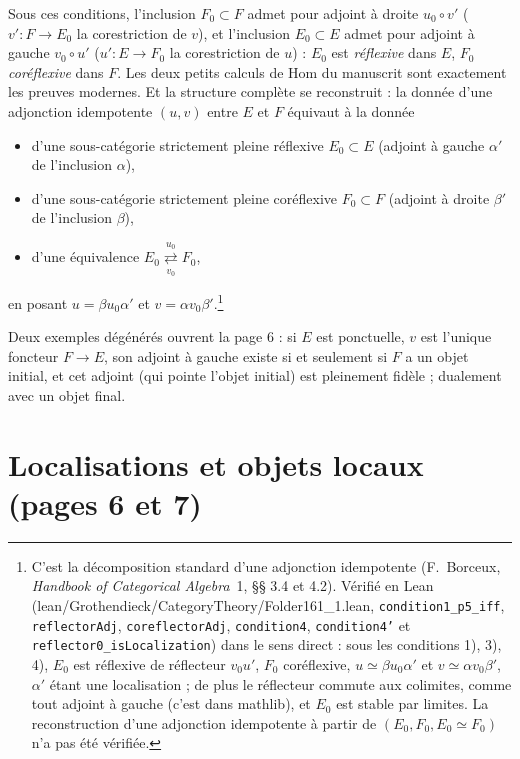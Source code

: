 \documentclass[11pt,a4paper]{article}
\begin{document}
Sous ces conditions, l'inclusion $F_0 \subset F$ admet pour adjoint à
droite $u_0 \circ v'$ ($v' : F \to E_0$ la corestriction de $v$), et
l'inclusion $E_0 \subset E$ admet pour adjoint à gauche $v_0 \circ u'$
($u' : E \to F_0$ la corestriction de $u$) : $E_0$ est
\emph{réflexive} dans $E$, $F_0$ \emph{coréflexive} dans $F$. Les deux
petits calculs de Hom du manuscrit sont exactement les preuves modernes.
Et la structure complète se reconstruit : la donnée d'une adjonction
idempotente $(u, v)$ entre $E$ et $F$ équivaut à la donnée
\begin{itemize}
\item d'une sous-catégorie strictement pleine réflexive $E_0 \subset E$
(adjoint à gauche $\alpha'$ de l'inclusion $\alpha$),
\item d'une sous-catégorie strictement pleine coréflexive $F_0 \subset F$
(adjoint à droite $\beta'$ de l'inclusion $\beta$),
\item d'une équivalence $E_0 \underset{v_0}{\overset{u_0}{\rightleftarrows}} F_0$,
\end{itemize}
en posant $u = \beta u_0 \alpha'$ et $v = \alpha v_0 \beta'$.\footnote{C'est
la décomposition standard d'une adjonction idempotente (F.~Borceux,
\emph{Handbook of Categorical Algebra}~1, §§ 3.4 et 4.2). Vérifié en Lean
(lean/Grothendieck/CategoryTheory/Folder161\_1.lean, \texttt{condition1\_p5\_iff},
\texttt{reflectorAdj}, \texttt{coreflectorAdj}, \texttt{condition4},
\texttt{condition4'} et \texttt{reflector0\_isLocalization}) dans le sens
direct : sous les conditions 1), 3), 4), $E_0$ est réflexive de réflecteur
$v_0 u'$, $F_0$ coréflexive, $u \simeq \beta u_0 \alpha'$ et
$v \simeq \alpha v_0 \beta'$, $\alpha'$ étant une localisation ; de plus le
réflecteur commute aux colimites, comme tout adjoint à gauche (c'est dans
mathlib), et $E_0$ est stable par limites. La reconstruction d'une adjonction
idempotente à partir de $(E_0, F_0, E_0 \simeq F_0)$ n'a pas été vérifiée.}

Deux exemples dégénérés ouvrent la page 6 : si $E$ est ponctuelle, $v$
est l'unique foncteur $F \to E$, son adjoint à gauche existe si et
seulement si $F$ a un objet initial, et cet adjoint (qui pointe l'objet
initial) est pleinement fidèle ; dualement avec un objet final.

\section*{Localisations et objets locaux (pages 6 et 7)}
\end{document}
